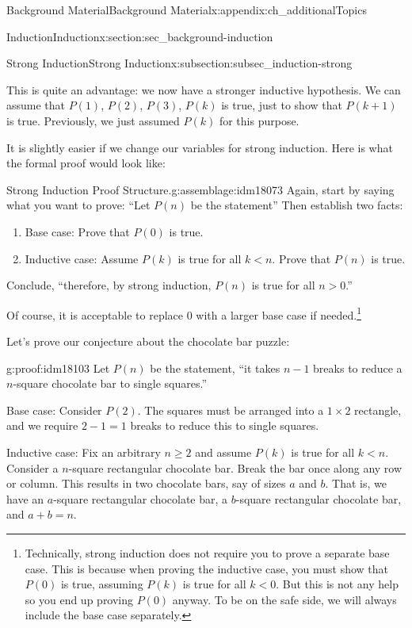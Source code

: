 \documentclass[oneside,10pt,]{book}
\numberwithin{equation}{chapter}
\newcommand{\lt}{<}
\newcommand{\gt}{>}
\begin{document}
\begin{appendixptx}{Background Material}{}{Background Material}{}{}{x:appendix:ch_additionalTopics}
\begin{sectionptx}{Induction}{}{Induction}{}{}{x:section:sec_background-induction}
\begin{subsectionptx}{Strong Induction}{}{Strong Induction}{}{}{x:subsection:subsec_induction-strong}
\par
This is quite an advantage: we now have a stronger inductive hypothesis. We can assume that \(P(1)\), \(P(2)\), \(P(3)\), \textellipsis{} \(P(k)\) is true, just to show that \(P(k+1)\) is true. Previously, we just assumed \(P(k)\) for this purpose.%
\par
It is slightly easier if we change our variables for strong induction. Here is what the formal proof would look like:%
\begin{assemblage}{Strong Induction Proof Structure.}{g:assemblage:idm18073}%
Again, start by saying what you want to prove: ``Let \(P(n)\) be the statement\textellipsis{}'' Then establish two facts:%
\begin{enumerate}
\item{}Base case: Prove that \(P(0)\) is true.%
\item{}Inductive case: Assume \(P(k)\) is true for all \(k \lt  n\). Prove that \(P(n)\) is true.%
\end{enumerate}
Conclude, ``therefore, by strong induction, \(P(n)\) is true for all \(n \gt 0\).''%
\end{assemblage}
Of course, it is acceptable to replace 0 with a larger base case if needed.\footnote{Technically, strong induction does not require you to prove a separate base case. This is because when proving the inductive case, you must show that \(P(0)\) is true, assuming \(P(k)\) is true for all \(k \lt  0\). But this is not any help so you end up proving \(P(0)\) anyway. To be on the safe side, we will always include the base case separately.\label{g:fn:idm18097}}%
\par
Let's prove our conjecture about the chocolate bar puzzle:%
\begin{proofptx}{}{g:proof:idm18103}
Let \(P(n)\) be the statement, ``it takes \(n-1\) breaks to reduce a \(n\)-square chocolate bar to single squares.''%
\par
Base case: Consider \(P(2)\). The squares must be arranged into a \(1\times 2\) rectangle, and we require \(2-1 = 1\) breaks to reduce this to single squares.%
\par
Inductive case: Fix an arbitrary \(n\ge 2\) and assume \(P(k)\) is true for all \(k \lt n\).  Consider a \(n\)-square rectangular chocolate bar.  Break the bar once along any row or column.  This results in two chocolate bars, say of sizes \(a\) and \(b\).  That is, we have an \(a\)-square rectangular chocolate bar, a \(b\)-square rectangular chocolate bar, and \(a+b = n\).%
\par

\end{proofptx}
\end{subsectionptx}
\end{sectionptx}
\end{appendixptx}
\end{document}

